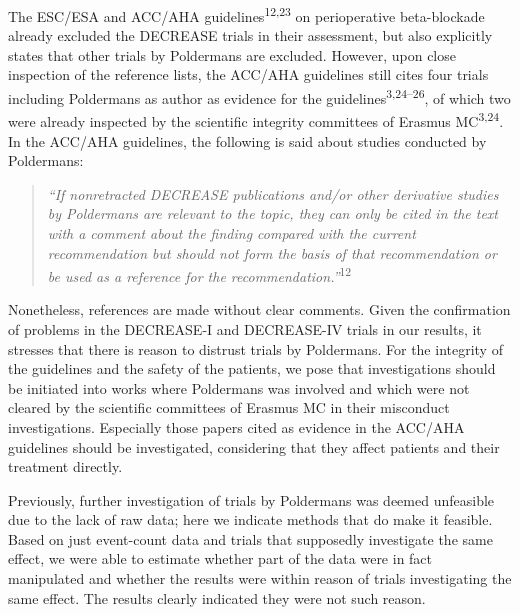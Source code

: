 \documentclass[]{article}
\begin{document}
The ESC/ESA and ACC/AHA guidelines\textsuperscript{12,23} on
perioperative beta-blockade already excluded the DECREASE trials in
their assessment, but also explicitly states that other trials by
Poldermans are excluded. However, upon close inspection of the reference
lists, the ACC/AHA guidelines still cites four trials including
Poldermans as author as evidence for the
guidelines\textsuperscript{3,24--26}, of which two were already
inspected by the scientific integrity committees of Erasmus
MC\textsuperscript{3,24}. In the ACC/AHA guidelines, the following is
said about studies conducted by Poldermans:

\begin{quote}
\emph{``If nonretracted DECREASE publications and/or other derivative
studies by Poldermans are relevant to the topic, they can only be cited
in the text with a comment about the finding compared with the current
recommendation but should not form the basis of that recommendation or
be used as a reference for the recommendation.''}\textsuperscript{12}
\end{quote}

Nonetheless, references are made without clear comments. Given the
confirmation of problems in the DECREASE-I and DECREASE-IV trials in our
results, it stresses that there is reason to distrust trials by
Poldermans. For the integrity of the guidelines and the safety of the
patients, we pose that investigations should be initiated into works
where Poldermans was involved and which were not cleared by the
scientific committees of Erasmus MC in their misconduct investigations.
Especially those papers cited as evidence in the ACC/AHA guidelines
should be investigated, considering that they affect patients and their
treatment directly.

Previously, further investigation of trials by Poldermans was deemed
unfeasible due to the lack of raw data; here we indicate methods that do
make it feasible. Based on just event-count data and trials that
supposedly investigate the same effect, we were able to estimate whether
part of the data were in fact manipulated and whether the results were
within reason of trials investigating the same effect. The results
clearly indicated they were not such reason.
\end{document}
